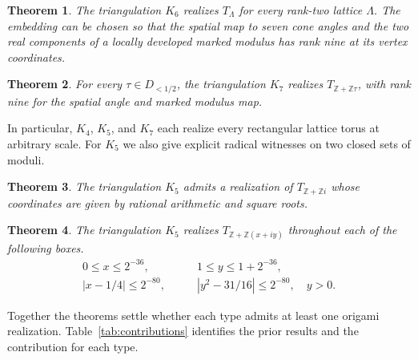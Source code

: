 \documentclass[11pt,letterpaper]{amsart}
\newtheorem{theorem}{Theorem}
\newcommand{\Z}{\mathbb Z}
\begin{document}
\begin{theorem}\label{thm:type6}
The triangulation \(K_6\) realizes \(T_\Lambda\) for every rank-two
lattice \(\Lambda\). The embedding can be chosen so that the spatial
map to seven cone angles and the two real components of a locally
developed marked modulus has rank nine at its vertex coordinates.
\end{theorem}

\begin{theorem}\label{thm:type7}
For every \(\tau\in D_{<1/2}\), the triangulation \(K_7\) realizes
\(T_{\Z+\Z\tau}\), with rank nine for the spatial angle and marked
modulus map.
\end{theorem}

In particular, \(K_4\), \(K_5\), and \(K_7\) each realize every
rectangular lattice torus at arbitrary scale. For \(K_5\) we also give
explicit radical witnesses on two closed sets of moduli.

\begin{theorem}\label{thm:type5square}
The triangulation \(K_5\) admits a realization of \(T_{\Z+\Z i}\) whose
coordinates are given by rational arithmetic and square roots.
\end{theorem}

\begin{theorem}\label{thm:type5box}
The triangulation \(K_5\) realizes \(T_{\Z+\Z(x+iy)}\) throughout
each of the following boxes.
\[
\begin{aligned}
 0\le x\le 2^{-36},&\qquad 1\le y\le 1+2^{-36},\\
 |x-1/4|\le 2^{-80},&\qquad |y^2-31/16|\le 2^{-80},\quad y>0 .
\end{aligned}
\]
\end{theorem}

Together the theorems settle whether each type admits at least one
origami realization. Table~\ref{tab:contributions} identifies the
prior results and the contribution for each type.
\end{document}
